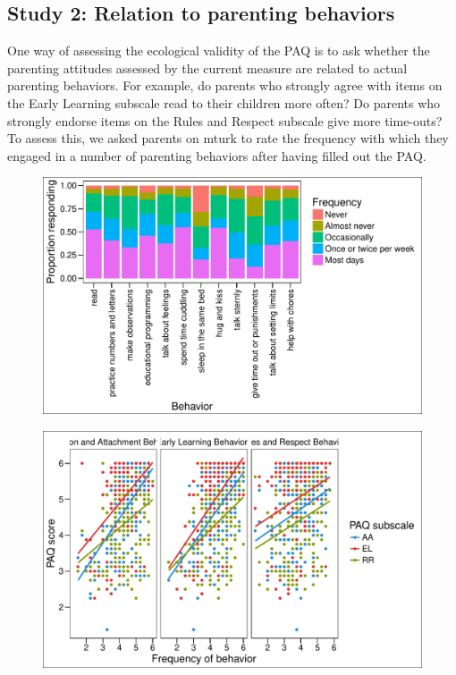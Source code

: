 \documentclass[floatsintext,man]{apa6}
\theoremstyle{definition}
\theoremstyle{definition}
\theoremstyle{definition}
\theoremstyle{remark}
\begin{document}
\subsection{Study 2: Relation to parenting
behaviors}\label{study-2-relation-to-parenting-behaviors}

One way of assessing the ecological validity of the PAQ is to ask
whether the parenting attitudes assessed by the current measure are
related to actual parenting behaviors. For example, do parents who
strongly agree with items on the Early Learning subscale read to their
children more often? Do parents who strongly endorse items on the Rules
and Respect subscale give more time-outs? To assess this, we asked
parents on mturk to rate the frequency with which they engaged in a
number of parenting behaviors after having filled out the PAQ.

\begin{figure}
\centering
\includegraphics{PAQ_paper_files/figure-latex/unnamed-chunk-22-1.pdf}
\caption{}
\end{figure}

\begin{figure}
\centering
\includegraphics{PAQ_paper_files/figure-latex/unnamed-chunk-24-1.pdf}
\caption{}
\end{figure}
\end{document}
